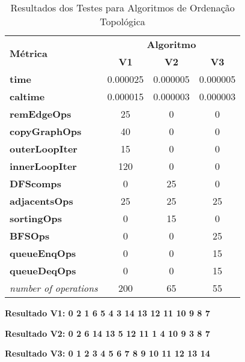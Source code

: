 \documentclass{report}
\begin{document}
\begin{table}[ht]
\centering
\label{tab:resultados}
\large
\begin{tabular}{|l|c|c|c|}
\hline
\multirow{2}{*}{\textbf{Métrica}} & \multicolumn{3}{c|}{\textbf{Algoritmo}} \\ \cline{2-4} 
                                  & \textbf{V1} & \textbf{V2} & \textbf{V3} \\ \hline
\textbf{time}                     & 0.000025    & 0.000005    & 0.000005    \\ \hline
\textbf{caltime}                  & 0.000015    & 0.000003    & 0.000003    \\ \hline
\textbf{remEdgeOps}               & 25          & 0           & 0           \\ \hline
\textbf{copyGraphOps}             & 40          & 0           & 0           \\ \hline
\textbf{outerLoopIter}            & 15          & 0           & 0           \\ \hline
\textbf{innerLoopIter}            & 120         & 0           & 0           \\ \hline
\textbf{DFScomps}                 & 0           & 25          & 0           \\ \hline
\textbf{adjacentsOps}             & 25          & 25          & 25          \\ \hline
\textbf{sortingOps}               & 0           & 15          & 0           \\ \hline
\textbf{BFSOps}                   & 0           & 0           & 25          \\ \hline
\textbf{queueEnqOps}              & 0           & 0           & 15          \\ \hline
\textbf{queueDeqOps}              & 0           & 0           & 15          \\ \hline
\textit{number of operations}     & 200         & 65          & 55          \\ \hline 
\end{tabular}

\caption{Resultados dos Testes para Algoritmos de Ordenação Topológica}
\end{table}

{
\normalsize

\hspace{33mm} \textbf{Resultado V1: 0 2 1 6 5 4 3 14 13 12 11 10 9 8 7 }

\hspace{33mm} \textbf{Resultado V2: 0 2 6 14 13 5 12 11 1 4 10 9 3 8 7 }

\hspace{33mm} \textbf{Resultado V3: 0 1 2 3 4 5 6 7 8 9 10 11 12 13 14 }

}
\end{document}
